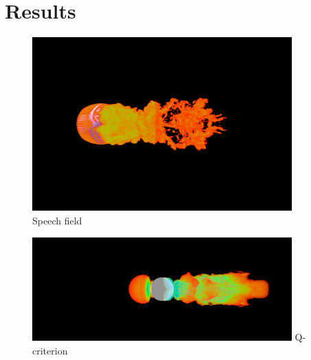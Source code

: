 \documentclass[acmtog]{acmart}
\begin{document}
	\section{Results}
	\begin{figure}[h]\centering 
		\centering
		\includegraphics[height=6.67cm,width=10cm]{result-bspline-trans10.png}\\
		Speech field
	\end{figure}
	\begin{figure}[hp]\centering 
		\centering
		\includegraphics[height=4cm,width=10cm]{result-velomodel.png}
		Q-criterion
	\end{figure}
	
	
	
\end{document}
